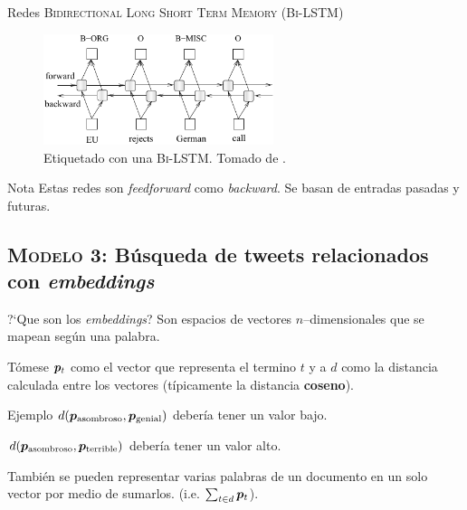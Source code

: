 \documentclass[10pt]{beamer}
\begin{document}
\begin{frame}{Redes \textsc{Bidirectional Long Short Term Memory (Bi-LSTM)}}
  \begin{figure}[H]
    \centering
    \includegraphics[width=0.6\textwidth]{Images/bilstm-arch.pdf}
    \caption[Etiquetado con una \textsc{Bi-LSTM}]{Etiquetado con una \textsc{Bi-LSTM}. Tomado de \cite{Huang2015}.}
    \label{fig:bilstm-arch}
  \end{figure}

  \begin{alertblock}{Nota}
    Estas redes son \emph{feedforward} como \emph{backward}. Se basan de entradas pasadas y futuras.
  \end{alertblock}
\end{frame}




\subsection{\textsc{Modelo 3:} Búsqueda de tweets relacionados con \emph{embeddings}}

\begin{frame}{?`Que son los \emph{embeddings}?}
  Son espacios de vectores $n$--dimensionales que se mapean según una palabra.

  Tómese ${\bm{p}}_{t}$ como el vector que representa el termino $t$ y a $d$ como la distancia calculada entre los vectores (típicamente la distancia \textbf{coseno}).

  \begin{alertblock}{Ejemplo}
    $d({\bm{p}}_{\text{asombroso}}, {\bm{p}}_{\text{genial}})$ debería tener un valor bajo.
    
    $d({\bm{p}}_{\text{asombroso}}, {\bm{p}}_{\text{terrible}})$ debería tener un valor alto.
  \end{alertblock}

  También se pueden representar varias palabras de un documento en un solo vector por medio de sumarlos. (i.e. $\sum_{t \in d}{\bm{p}}_{t}$).
\end{frame}
\end{document}
